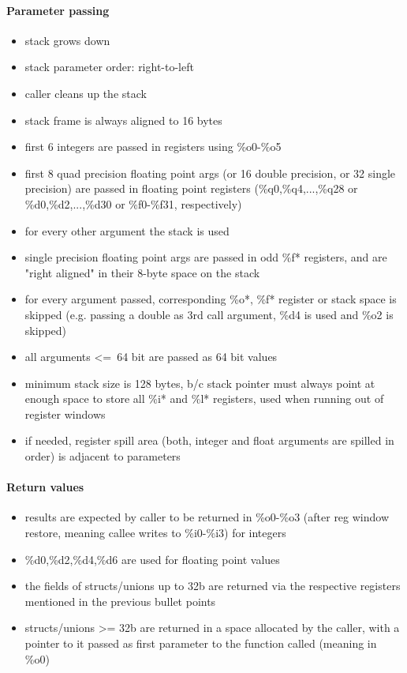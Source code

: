 \paragraph{Parameter passing}
\begin{itemize}
\item stack grows down
\item stack parameter order: right-to-left
\item caller cleans up the stack
\item stack frame is always aligned to 16 bytes
\item first 6 integers are passed in registers using \%o0-\%o5
\item first 8 quad precision floating point args (or 16 double precision, or 32 single precision) are passed in floating point registers (\%q0,\%q4,...,\%q28 or \%d0,\%d2,...,\%d30 or \%f0-\%f31, respectively)
\item for every other argument the stack is used
\item single precision floating point args are passed in odd \%f* registers, and are "right aligned" in their 8-byte space on the stack
\item for every argument passed, corresponding \%o*, \%f* register or stack space is skipped (e.g. passing a double as 3rd call argument, \%d4 is used and \%o2 is skipped)
\item all arguments \textless=\ 64 bit are passed as 64 bit values
\item minimum stack size is 128 bytes, b/c stack pointer must always point at enough space to store all \%i* and \%l* registers, used when running out of register windows
\item if needed, register spill area (both, integer and float arguments are spilled in order) is adjacent to parameters
\end{itemize}

\paragraph{Return values}

\begin{itemize}
\item results are expected by caller to be returned in \%o0-\%o3 (after reg window restore, meaning callee writes to \%i0-\%i3) for integers
\item \%d0,\%d2,\%d4,\%d6 are used for floating point values
\item the fields of structs/unions up to 32b are returned via the respective registers mentioned in the previous bullet points
\item structs/unions \textgreater= 32b are returned in a space allocated by the caller, with a pointer to it passed as first parameter to the function called (meaning in \%o0)
\end{itemize}

